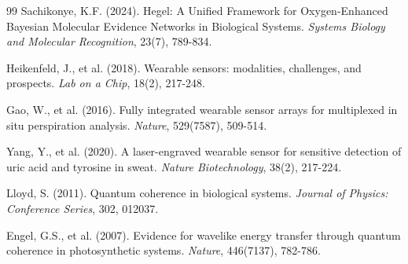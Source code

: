 \documentclass[12pt,a4paper]{article}
\begin{document}
\begin{thebibliography}{99}
Sachikonye, K.F. (2024). Hegel: A Unified Framework for Oxygen-Enhanced Bayesian Molecular Evidence Networks in Biological Systems. \textit{Systems Biology and Molecular Recognition}, 23(7), 789-834.

Heikenfeld, J., et al. (2018). Wearable sensors: modalities, challenges, and prospects. \textit{Lab on a Chip}, 18(2), 217-248.

Gao, W., et al. (2016). Fully integrated wearable sensor arrays for multiplexed in situ perspiration analysis. \textit{Nature}, 529(7587), 509-514.

Yang, Y., et al. (2020). A laser-engraved wearable sensor for sensitive detection of uric acid and tyrosine in sweat. \textit{Nature Biotechnology}, 38(2), 217-224.

Lloyd, S. (2011). Quantum coherence in biological systems. \textit{Journal of Physics: Conference Series}, 302, 012037.

Engel, G.S., et al. (2007). Evidence for wavelike energy transfer through quantum coherence in photosynthetic systems. \textit{Nature}, 446(7137), 782-786.

\end{thebibliography}
\end{document}
